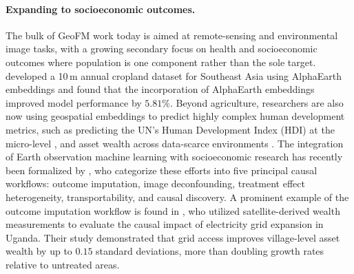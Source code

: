 \documentclass[12pt,letterpaper]{article}
\begin{document}
\paragraph{Expanding to socioeconomic outcomes.} The bulk of GeoFM work today is aimed at remote-sensing and environmental image tasks, with a growing secondary focus on health and socioeconomic outcomes where population is one component rather than the sole target. \textcite{cai_annual_2026} developed a 10\,m annual cropland dataset for Southeast Asia using AlphaEarth embeddings and found that the incorporation of AlphaEarth embeddings improved model performance by $5.81\%$. Beyond agriculture, researchers are also now using geospatial embeddings to predict highly complex human development metrics, such as predicting the UN's Human Development Index (HDI) at the micro-level \parencite{sherman2026global}, and asset wealth across data-scarce environments \parencite{zheng2025dynamic}. The integration of Earth observation machine learning with socioeconomic research has recently been formalized by \textcite{sakamoto2025scoping}, who categorize these efforts into five principal causal workflows: outcome imputation, image deconfounding, treatment effect heterogeneity, transportability, and causal discovery. A prominent example of the outcome imputation workflow is found in \textcite{ratledge2022using}, who utilized satellite-derived wealth measurements to evaluate the causal impact of electricity grid expansion in Uganda. Their study demonstrated that grid access improves village-level asset wealth by up to $0.15$ standard deviations, more than doubling growth rates relative to untreated areas.
\end{document}
